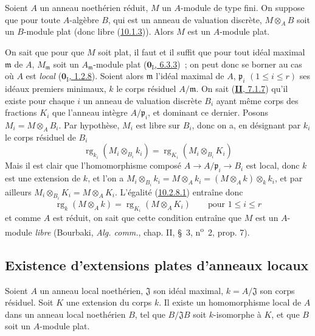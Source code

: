 \begin{proposition}[10.2.8]
\label{0.10.2.8-fr}
Soient $A$ un anneau noethérien réduit, $M$ un $A$-module de type fini. On
suppose que pour toute $A$-algèbre $B$, qui est un anneau de valuation
discrète, $M\otimes_A B$ soit un $B$-module plat (donc libre
\textup{(\hyperref[0.10.1.3-fr]{10.1.3}))}. Alors $M$ est un $A$-module plat.
\end{proposition}

On sait que pour que $M$ soit plat, il faut et il suffit que pour tout idéal
maximal $\mathfrak m$ de $A$, $M_{\mathfrak m}$ soit un
$A_{\mathfrak m}$-module plat
(\hyperref[0.6.3.3-fr]{$\mathbf{0}_{\mathrm I}$, 6.3.3})~; on peut donc se borner au cas
où $A$ est \emph{local} (\hyperref[0.1.2.8-fr]{$\mathbf{0}_{\mathrm I}$, 1.2.8}).
Soient alors $\mathfrak m$ l'idéal maximal de $A$, $\mathfrak p_i$
$(1\leq i\leq r)$ ses idéaux premiers minimaux, $k$ le corps résiduel
$A/\mathfrak m$. On sait (\hyperref[II.7.1.7-fr]{\textbf{II}, 7.1.7}) qu'il existe
pour chaque $i$ un anneau de valuation discrète $B_i$ ayant même corps des
fractions $K_i$ que l'anneau intègre $A/\mathfrak p_i$, et dominant ce
dernier. Posons $M_i=M\otimes_A B_i$. Par hypothèse, $M_i$ est libre sur
$B_i$, donc on a, en désignant par $k_i$ le corps résiduel de $B_i$
\[
\label{0.10.2.8.1-fr}
  \operatorname{rg}_{k_i}(M_i\otimes_{B_i}k_i)
  =\operatorname{rg}_{K_i}(M_i\otimes_{B_i}K_i)
  \tag{10.2.8.1}
\]
Mais il est clair que l'homomorphisme composé
$A\to A/\mathfrak p_i\to B_i$ est local, donc $k$ est une extension de $k$,
et l'on a
$M_i\otimes_{B_i}k_i=M\otimes_A k_i=(M\otimes_A k)\otimes_k k_i$, et par
ailleurs $M_i\otimes_{B_i}K_i=M\otimes_A K_i$. L'égalité
(\hyperref[0.10.2.8.1-fr]{10.2.8.1}) entraîne donc
\[
  \operatorname{rg}_k(M\otimes_A k)=\operatorname{rg}_{K_i}(M\otimes_A K_i)
  \qquad\text{pour }1\leq i\leq r
\]
et comme $A$ est réduit, on sait que cette condition entraîne que $M$ est un
$A$-module \emph{libre} (Bourbaki, \emph{Alg. comm.}, chap. II, \S~3,
n\textsuperscript{o}~2, prop. 7).

\subsection{Existence d'extensions plates d'anneaux locaux}
\label{subsection:0.10.3-fr}

\begin{proposition}[10.3.1]
\label{0.10.3.1-fr}
Soient $A$ un anneau local noethérien, $\mathfrak J$ son idéal maximal,
$k=A/\mathfrak J$ son corps résiduel. Soit $K$ une extension du corps $k$. Il
existe un homomorphisme local de $A$ dans un anneau local noethérien $B$, tel
que $B/\mathfrak J B$ soit $k$-isomorphe à $K$, et que $B$ soit un
$A$-module plat.
\end{proposition}

